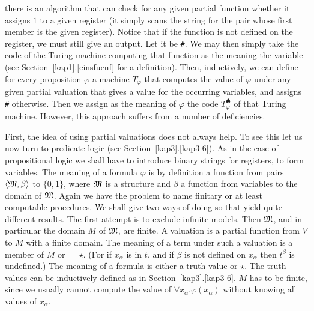 there is an algorithm that can check for any given partial
function whether it assigns $1$ to a given register
(it simply scans the string for the pair whose first member
is the given register). Notice that if the function is not defined
on the register, we must still give an output. Let it be {\tt \#}.
We may then simply take the code of the Turing machine computing
that function as the meaning the variable (see
Section~\ref{kap1}.\ref{einsfuenf} for a definition). Then, inductively, we
can define for every proposition $\varphi$ a machine $T_{\varphi}$
that computes the value of $\varphi$ under any given partial
valuation that gives a value for the occurring variables, and
assigns {\tt \#} otherwise. Then we assign as the meaning of
$\varphi$ the code $T_{\varphi}^{\spadesuit}$ of that Turing
machine. However, this approach suffers from a number of deficiencies.

First, the idea of using partial valuations does not always help.
To see this let us now turn to predicate logic
(see Section~\ref{kap3}.\ref{kap3-6}). As in the case of propositional
logic we shall have to introduce binary strings for registers,
to form variables. The meaning of a formula $\varphi$ is by
definition a function from pairs $\langle \mathfrak{M}, \beta\rangle$ to $\{0,1\}$,
where $\mathfrak{M}$ is a structure and $\beta$ a function from variables
to the domain of $\mathfrak{M}$. Again we have the problem to name finitary
or at least computable procedures. We shall give two ways of doing so
that yield quite different results. The first attempt is to
exclude infinite models. Then $\mathfrak{M}$, and in particular the domain
$M$ of $\mathfrak{M}$, are finite.  A valuation is a partial function from
$V$ to $M$ with a finite domain. The meaning of a term under such
a valuation is a member of $M$ or $= \star$. (For if $x_{\alpha}$
is in $t$, and if $\beta$ is not defined on $x_{\alpha}$ then
$t^{\beta}$ is undefined.) The meaning of a formula is either a
truth value or $\star$. The truth values can be inductively defined
as in Section~\ref{kap3}.\ref{kap3-6}. $M$ has to be finite, since we usually
cannot compute the value of $\forall x_{\alpha}.\varphi(x_{\alpha})$
without knowing all values of $x_{\alpha}$.

